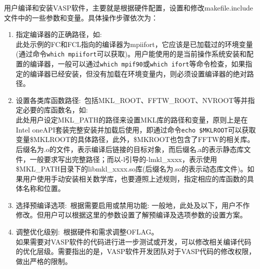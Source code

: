 用户编译和安装\textrm{VASP}软件，主要就是根据硬件配置，设置和修改\textrm{makefile.include}文件中的一些参数和变量。具体操作步骤依次为：
\begin{enumerate}
	\item  指定编译器的正确路径，如:\\
{\fontsize{8.2pt}{6.2pt}\selectfont{
}}
此处示例的\textrm{FC}和\textrm{FCL}指向的编译器为\textrm{mpiifort}，它应该是已加载过的环境变量(通过命令\texttt{which mpiifort}可以获取)。用户能使用的是当前操作系统安装和配置的编译器，一般可以通过\texttt{which mpif90}或\texttt{which ifort}等命令检查，如果指定的编译器已经安装，但没有加载在环境变量内，则必须设置编译器的绝对路径。
	\item 设置各类库函数路径:~包括\textrm{MKL\_ROOT}、\textrm{FFTW\_ROOT}、\textrm{NVROOT}等并指定必要的库函数名，如:\\
{\fontsize{8.2pt}{6.2pt}\selectfont{
}}
此处用户设定\textrm{MKL\_PATH}的路径来设置\textrm{MKL}库的路径和变量，原则上是在\textrm{Intel oneAPI}套装完整安装并加载后使用，即通过命令\texttt{echo \$MKLROOT}可以获取变量\textrm{\$MKLROOT}的具体路径，此外，\textrm{\$MKROOT}也包含了\textrm{FFTW}的相关库。后缀名为\textrm{.o}的文件，表示编译后链接的目标对象，而后缀名\textrm{.a}的表示静态库文件，一般要求写出完整路径；而以\textrm{-l}引导的\textrm{-lmkl\_xxxx}，表示使用\textrm{\$MKL\_PATH}目录下的\textrm{libmkl\_xxxx.so}库(后缀名为\textrm{.so}的表示动态库文件)。如果用户使用手动安装相关数学库，也要遵照上述规则，指定相应的库函数的具体名称和位置。%
	\item 选择预编译选项:~根据需要启用或禁用功能:
{\fontsize{8.2pt}{6.2pt}\selectfont{
}}
一般地，此处及以下，用户不作修改。但用户可以根据这里的参数设置了解预编译及选项参数的设置方案。
	\item 调整优化级别:~根据硬件和需求调整\textrm{OFLAG}。\\
		如果需要对\textrm{VASP}软件的代码进行进一步测试或开发，可以修改相关编译代码的优化层级。需要指出的是，\textrm{VASP}软件开发团队对于\textrm{VASP}代码的修改权限，做出严格的限制。
\end{enumerate}

